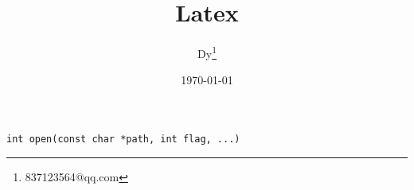 \documentclass[10pt,a4paper]{article}
\begin{document}
\begin{CJK}{UTF8}{gbsn}

\author{Dy\footnote{837123564@qq.com}}
\title{Latex}
\date{\today}
\maketitle
\thispagestyle{empty} %
\newpage
\tableofcontents
\lstset{language=C,numbers=none}

\begin{lstlisting}
int open(const char *path, int flag, ...)
\end{lstlisting}

\end{CJK}
\end{document}
